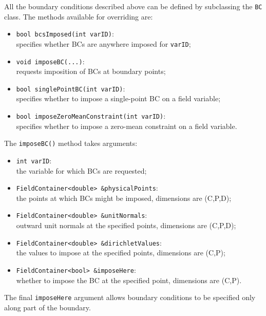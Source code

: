 All the boundary conditions described above can be defined by subclassing the \verb=BC= class.  The methods available for overriding are:
\begin{itemize}
\item \verb=bool bcsImposed(int varID)=:\\ specifies whether BCs are anywhere imposed for \verb=varID=;
\item \verb=void imposeBC(...)=:\\ requests imposition of BCs at boundary points;
\item \verb=bool singlePointBC(int varID)=:\\ specifies whether to impose a single-point BC on a field variable;
\item \verb=bool imposeZeroMeanConstraint(int varID)=:\\ specifies whether to impose a zero-mean constraint on a field variable.
\end{itemize}
The \verb=imposeBC()= method takes arguments:
\begin{itemize}
\item \verb=int varID=:\\ the variable for which BCs are requested;
\item \verb=FieldContainer<double> &physicalPoints=:\\ the points at which BCs might be imposed,  dimensions are (C,P,D);
\item \verb=FieldContainer<double> &unitNormals=:\\ outward unit normals at the specified points,  dimensions are (C,P,D);
\item \verb=FieldContainer<double> &dirichletValues=:\\ the values to impose at the specified points, dimensions are (C,P);
\item \verb=FieldContainer<bool> &imposeHere=:\\ whether to impose the BC at the specified point, dimensions are (C,P).
\end{itemize}
The final \verb=imposeHere= argument allows boundary conditions to be specified only along part of the boundary.

